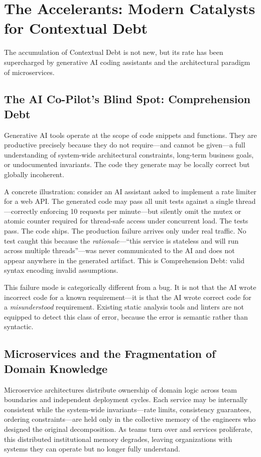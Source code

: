 \documentclass[11pt, a4paper]{article}
\begin{document}
\section{The Accelerants: Modern Catalysts for Contextual Debt}

The accumulation of Contextual Debt is not new, but its rate has been supercharged by generative AI coding assistants and the architectural paradigm of microservices.

\subsection{The AI Co-Pilot's Blind Spot: Comprehension Debt}

Generative AI tools operate at the scope of code snippets and functions. They are productive precisely because they do not require—and cannot be given—a full understanding of system-wide architectural constraints, long-term business goals, or undocumented invariants. The code they generate may be locally correct but globally incoherent.

A concrete illustration: consider an AI assistant asked to implement a rate limiter for a web API. The generated code may pass all unit tests against a single thread—correctly enforcing 10 requests per minute—but silently omit the mutex or atomic counter required for thread-safe access under concurrent load. The tests pass. The code ships. The production failure arrives only under real traffic. No test caught this because the \emph{rationale}—``this service is stateless and will run across multiple threads''—was never communicated to the AI and does not appear anywhere in the generated artifact. This is Comprehension Debt: valid syntax encoding invalid assumptions.

This failure mode is categorically different from a bug. It is not that the AI wrote incorrect code for a known requirement—it is that the AI wrote correct code for a \emph{misunderstood} requirement. Existing static analysis tools and linters are not equipped to detect this class of error, because the error is semantic rather than syntactic.

\subsection{Microservices and the Fragmentation of Domain Knowledge}

Microservice architectures distribute ownership of domain logic across team boundaries and independent deployment cycles. Each service may be internally consistent while the system-wide invariants—rate limits, consistency guarantees, ordering constraints—are held only in the collective memory of the engineers who designed the original decomposition. As teams turn over and services proliferate, this distributed institutional memory degrades, leaving organizations with systems they can operate but no longer fully understand.
\end{document}

